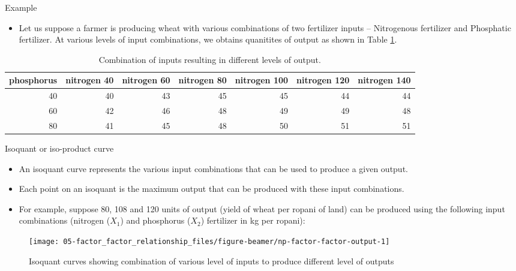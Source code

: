 \documentclass[12pt,ignorenonframetext,aspectratio=169]{beamer}
\providecommand{\tightlist}{%
  \setlength{\itemsep}{0pt}\setlength{\parskip}{0pt}}
\begin{document}
\begin{frame}{Example}
\protect\hypertarget{example}{}
\begin{itemize}
\tightlist
\item
  Let us suppose a farmer is producing wheat with various combinations
  of two fertilizer inputs -- Nitrogenous fertilizer and Phosphatic
  fertilizer. At various levels of input combinations, we obtains
  quanitites of output as shown in Table \ref{tab:np-factor-factor}.
\end{itemize}

\begin{table}

\caption{\label{tab:np-factor-factor}Combination of inputs resulting in different levels of output.}
\centering
\fontsize{6}{8}\selectfont
\begin{tabular}[t]{rrrrrrr}
\toprule
phosphorus & nitrogen 40 & nitrogen 60 & nitrogen 80 & nitrogen 100 & nitrogen 120 & nitrogen 140\\
\midrule
\rowcolor{gray!6}  40 & 40 & 43 & 45 & 45 & 44 & 44\\
60 & 42 & 46 & 48 & 49 & 49 & 48\\
\rowcolor{gray!6}  80 & 41 & 45 & 48 & 50 & 51 & 51\\
\bottomrule
\end{tabular}
\end{table}
\end{frame}

\begin{frame}{Isoquant or iso-product curve}
\protect\hypertarget{isoquant-or-iso-product-curve}{}
\begin{itemize}
\tightlist
\item
  An isoquant curve represents the various input combinations that can
  be used to produce a given output.
\item
  Each point on an isoquant is the maximum output that can be produced
  with these input combinations.
\item
  For example, suppose 80, 108 and 120 units of output (yield of wheat
  per ropani of land) can be produced using the following input
  combinations (nitrogen (\(X_1\)) and phosphorus (\(X_2\)) fertilizer
  in kg per ropani):
\end{itemize}
\end{frame}

\begin{frame}{}
\protect\hypertarget{section}{}
\begin{figure}

{\centering \texttt{[image: 05-factor\_factor\_relationship\_files/figure-beamer/np-factor-factor-output-1]} 

}

\caption{Isoquant curves showing combination of various level of inputs to produce different level of outputs}\label{fig:np-factor-factor-output}
\end{figure}
\end{frame}
\end{document}
